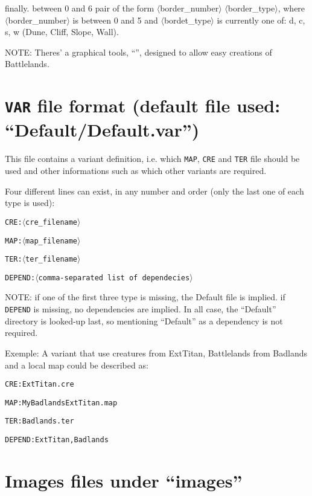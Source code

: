 \documentclass{article}
\begin{document}
finally. between 0 and 6 pair of the form $\langle$border\_number$\rangle$ $\langle$border\_type$\rangle$, where $\langle$border\_number$\rangle$ is between 0 and 5 and $\langle$bordet\_type$\rangle$ is currently one of: d, c, s, w (Dune, Cliff, Slope, Wall).

NOTE: Theres' a graphical tools,
``'',
designed to allow easy creations of Battlelands.

\section{\texttt{VAR} file format (default file used: ``Default/Default.var'')}

This file contains a variant definition, i.e. which
\texttt{MAP}, \texttt{CRE} and \texttt{TER} file should be used and other informations such as which other variants are required.

Four different lines can exist, in any number and order (only the last one of each type is used):

\texttt{\texttt{CRE}:$\langle$cre\_filename$\rangle$}

\texttt{\texttt{MAP}:$\langle$map\_filename$\rangle$}

\texttt{\texttt{TER}:$\langle$ter\_filename$\rangle$}

\texttt{\texttt{DEPEND}:$\langle$comma-separated list of dependecies$\rangle$}

NOTE: if one of the  first three type is missing, the Default file is implied. if \texttt{DEPEND} is missing, no dependencies are implied. In all case, the ``Default'' directory is looked-up last, so mentioning ``Default'' as a dependency is not required.

Exemple: A variant that use creatures from ExtTitan, Battlelands from Badlands and a local map could be described as:

\texttt{\texttt{CRE}:ExtTitan.cre}

\texttt{\texttt{MAP}:MyBadlandsExtTitan.map}

\texttt{\texttt{TER}:Badlands.ter}

\texttt{\texttt{DEPEND}:ExtTitan,Badlands}

\section{Images files under ``images''}
\label{images}
\end{document}
